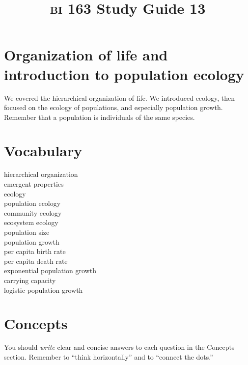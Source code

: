 \documentclass[letterpaper]{tufte-handout}
\title{{\scshape bi} 163 Study Guide 13}
\date{} %
\begin{document}
\maketitle	%

\section*{Organization of life and introduction to population ecology}

We covered the hierarchical organization of life. We introduced ecology, then focused on the ecology of populations, and especially population growth.  Remember that a population is individuals of the same species.

\section*{Vocabulary}

\vspace{-1\baselineskip}
\begin{multicols}{2}
hierarchical organization \\
emergent properties \\
ecology\\
population ecology\\
community ecology \\
ecosystem ecology \\
population size\\
population growth\\
per capita birth rate\\
per capita death rate\\
exponential population growth\\
carrying capacity\\
logistic population growth\\
\end{multicols}

\section*{Concepts}

You should \emph{write} clear and concise answers to each question in the Concepts section.  Remember to ``think horizontally'' and to ``connect the dots.'' 
\end{document}
